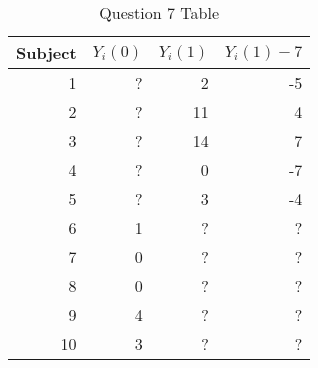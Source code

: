 \documentclass[11pt,notitlepage]{article}\usepackage[]{graphicx}\usepackage[]{color}
\begin{document}
\begin{table}[htbp]
  \centering
  \caption{Question 7 Table}
    \begin{tabular}{rrrr}
    \toprule
     Subject & $Y_i(0)$      & $Y_i(1)$       & $Y_i(1) - 7$  \\
    \midrule
    1     &   ?    &   2    &  -5 \\
    2     &   ?    &  11     &  4 \\
    3     &   ?    &  14     &  7 \\
    4     &   ?    &  0     &   -7\\
    5     &   ?    &  3     &   -4\\
    6     &   1    &  ?     &   ?\\
    7     &   0    &  ?     & ?  \\
    8     &   0    &  ?     & ?  \\
    9     &   4    &  ?     & ?  \\
    10    &   3    &  ?     & ? \\
    \bottomrule
    \end{tabular}%
  \label{tab:addlabel}%
\end{table}
\end{document}
